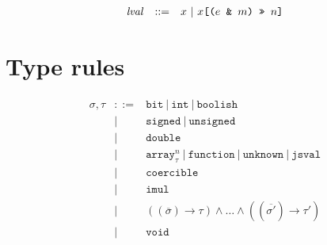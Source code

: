 \documentclass{article}
\newcommand{\paren}[1]{\mathjs{(}{#1}\mathjs{)}}
\newcommand{\funty}[2]{({#1}) \rightarrow {#2}}
\newcommand{\seq}[1]{\overline{{#1}}}
\newcommand{\mathjs}[1]{\mbox{\texttt{{#1}}}}
\newcommand{\bit}{\mathtt{bit}}
\newcommand{\unsigned}{\mathtt{unsigned}}
\newcommand{\signed}{\mathtt{signed}}
\newcommand{\double}{\mathtt{double}}
\newcommand{\arr}[2]{\mathtt{array}^{#1}_{#2}}
\newcommand{\jsval}{\mathtt{jsval}}
\newcommand{\unk}{\mathtt{unknown}}
\newcommand{\str}{\mathtt{string}}
\newcommand{\undef}{\mathtt{undefined}}
\newcommand{\void}{\mathtt{void}}
\newcommand{\nul}{\mathtt{null}}
\newcommand{\num}{\mathtt{number}}
\newcommand{\obj}{\mathtt{object}}
\newcommand{\getprop}[2]{{#1}\mathjs{[}{#2}\mathjs{]}}
\renewcommand{\int}{\mathtt{int}}
\newcommand{\function}{\mathtt{function}}
\newcommand{\union}[2]{{#1}\mathrel{|}{#2}}
\newcommand{\boolish}{\mathtt{boolish}}
\newcommand{\imul}{\mathtt{imul}}
\newcommand{\coercible}{\mathtt{coercible}}
\begin{document}
\[\begin{array}{rcl}
\mathit{lval} & ::= & x ~|~ \getprop{x}{\paren{e\mathjs{ \& }m}\mathjs{ >> }n} \\
\end{array}
\]

\section{Type rules}

\[
\begin{array}{rcl}
\sigma, \tau & ::= & \bit ~|~ \int ~|~ \boolish \\
             &  |  & \signed ~|~ \unsigned \\
             &  |  & \double \\
             &  |  & \arr{n}{\tau} ~|~ \function ~|~ \unk ~|~ \jsval \\
             &  |  & \coercible \\
             &  |  & \imul \\
             &  |  & (\funty{\seq{\sigma}}{\tau}) \land \ldots \land (\funty{\seq{\sigma'}}{\tau'}) \\
             &  |  & \void \\
\end{array}
\]
\end{document}
